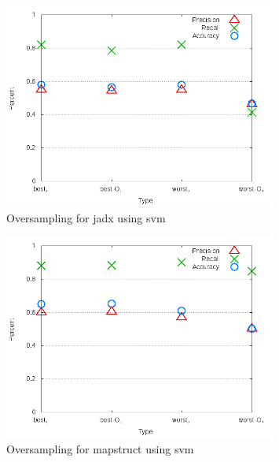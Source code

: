 \begin{figure}[!t]
\centering
\includegraphics[width=0.8\textwidth]{images/svm/test_4/jadx_sample_range.png}
\caption{Oversampling for jadx using \gls{svm}}
\label{fig:test_4_jadx_svm}
\end{figure}

\begin{figure}[!t]
\centering
\includegraphics[width=0.8\textwidth]{images/svm/test_4/mapstruct_sample_range.png}
\caption{Oversampling for mapstruct using \gls{svm}}
\label{fig:test_4_mapstruct_svm}
\end{figure}

